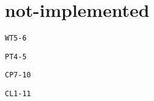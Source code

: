 \documentclass[11pt]{article}
\begin{document}
    \pagestyle{fancy}
    \chead{}

	\section*{not-implemented}
		\par \texttt{WT5-6}
		\par \texttt{PT4-5}
		\par \texttt{CP7-10}
		\par \texttt{CL1-11}
		
\end{document}
